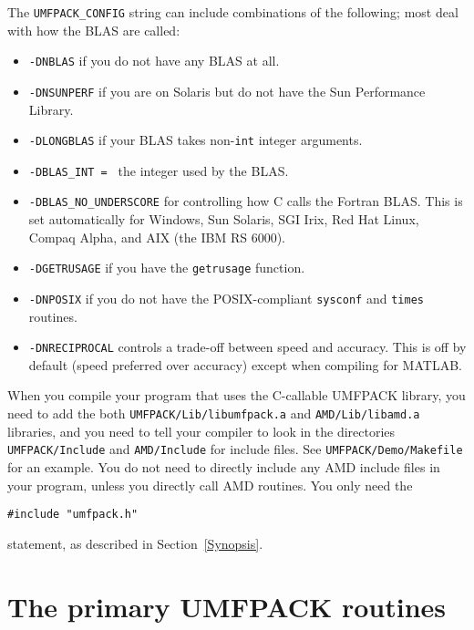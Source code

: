 \documentclass[11pt]{article}
\begin{document}
The {\tt UMFPACK\_CONFIG} string can include combinations of the following;
most deal with how the BLAS are called:
\begin{itemize}
\item {\tt -DNBLAS} if you do not have any BLAS at all.
\item {\tt -DNSUNPERF} if you are on Solaris but do not have the Sun
    Performance Library.
\item {\tt -DLONGBLAS} if your BLAS takes non-{\tt int} integer arguments.
\item {\tt -DBLAS\_INT = } the integer used by the BLAS.

\item {\tt -DBLAS\_NO\_UNDERSCORE}
    for controlling how C calls the Fortran BLAS.
    This is set automatically for Windows,
    Sun Solaris, SGI Irix, Red Hat Linux, Compaq Alpha, and
    AIX (the IBM RS 6000).

\item {\tt -DGETRUSAGE} if you have the {\tt getrusage} function.
\item {\tt -DNPOSIX} if you do not have the POSIX-compliant
    {\tt sysconf} and {\tt times} routines.
\item {\tt -DNRECIPROCAL} controls a trade-off between speed and accuracy.
    This is off by default (speed preferred over accuracy) except when
    compiling for MATLAB.
\end{itemize}

When you compile your program that uses the C-callable UMFPACK library,
you need to add the both {\tt UMFPACK/Lib/libumfpack.a} and
{\tt AMD/Lib/libamd.a}
libraries, and you need to tell your compiler to look in the
directories {\tt UMFPACK/Include} and {\tt AMD/Include} for include
files.  See {\tt UMFPACK/Demo/Makefile} for an example.
You do not need to directly include any AMD include files in your
program, unless you directly call AMD routines.  You only need the
\begin{verbatim}
#include "umfpack.h"
\end{verbatim}
statement, as described in Section~\ref{Synopsis}.

\newpage
\section{The primary UMFPACK routines}
\label{Primary}
\end{document}
